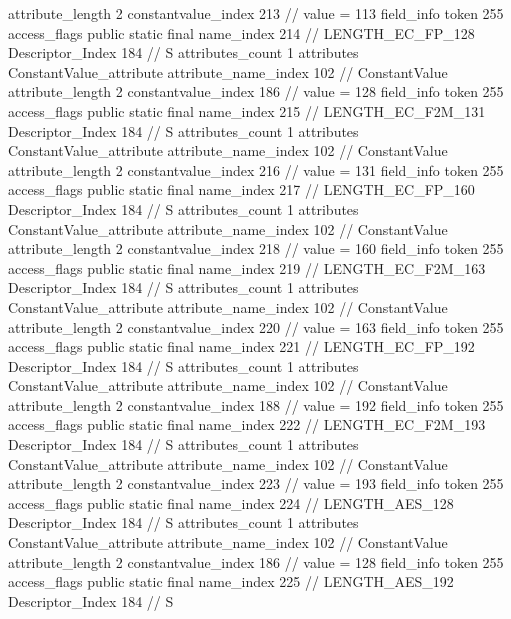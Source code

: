 {{{{{{{					attribute_length	2
					constantvalue_index	213		// value = 113
				}
				}
			}
			field_info {
				token	255
				access_flags	public static final
				name_index	214		// LENGTH_EC_FP_128
				Descriptor_Index	184		// S
				attributes_count	1
				attributes {
				ConstantValue_attribute {
					attribute_name_index	102		// ConstantValue
					attribute_length	2
					constantvalue_index	186		// value = 128
				}
				}
			}
			field_info {
				token	255
				access_flags	public static final
				name_index	215		// LENGTH_EC_F2M_131
				Descriptor_Index	184		// S
				attributes_count	1
				attributes {
				ConstantValue_attribute {
					attribute_name_index	102		// ConstantValue
					attribute_length	2
					constantvalue_index	216		// value = 131
				}
				}
			}
			field_info {
				token	255
				access_flags	public static final
				name_index	217		// LENGTH_EC_FP_160
				Descriptor_Index	184		// S
				attributes_count	1
				attributes {
				ConstantValue_attribute {
					attribute_name_index	102		// ConstantValue
					attribute_length	2
					constantvalue_index	218		// value = 160
				}
				}
			}
			field_info {
				token	255
				access_flags	public static final
				name_index	219		// LENGTH_EC_F2M_163
				Descriptor_Index	184		// S
				attributes_count	1
				attributes {
				ConstantValue_attribute {
					attribute_name_index	102		// ConstantValue
					attribute_length	2
					constantvalue_index	220		// value = 163
				}
				}
			}
			field_info {
				token	255
				access_flags	public static final
				name_index	221		// LENGTH_EC_FP_192
				Descriptor_Index	184		// S
				attributes_count	1
				attributes {
				ConstantValue_attribute {
					attribute_name_index	102		// ConstantValue
					attribute_length	2
					constantvalue_index	188		// value = 192
				}
				}
			}
			field_info {
				token	255
				access_flags	public static final
				name_index	222		// LENGTH_EC_F2M_193
				Descriptor_Index	184		// S
				attributes_count	1
				attributes {
				ConstantValue_attribute {
					attribute_name_index	102		// ConstantValue
					attribute_length	2
					constantvalue_index	223		// value = 193
				}
				}
			}
			field_info {
				token	255
				access_flags	public static final
				name_index	224		// LENGTH_AES_128
				Descriptor_Index	184		// S
				attributes_count	1
				attributes {
				ConstantValue_attribute {
					attribute_name_index	102		// ConstantValue
					attribute_length	2
					constantvalue_index	186		// value = 128
				}
				}
			}
			field_info {
				token	255
				access_flags	public static final
				name_index	225		// LENGTH_AES_192
				Descriptor_Index	184		// S
}}}}}
